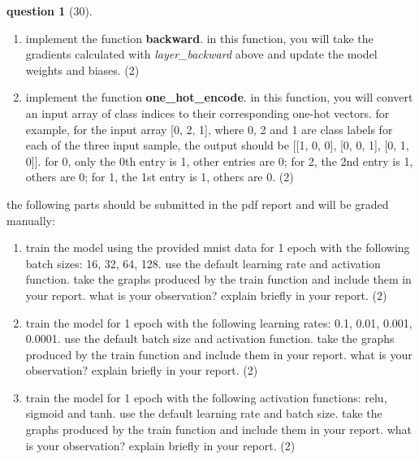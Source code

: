 \documentclass[12pt]{article}
\theoremstyle{definition}
\newtheorem{exercise}{question}%
\begin{document}
\begin{exercise}[30]
{\begin{enumerate}[label=(\theexercise.\arabic*)]
\begin{enumerate}
        \item implement the function \textbf{backward}. in this function, you will take the gradients calculated with \textit{layer\_backward} above and update the model weights and biases. (2)
        \item implement the function \textbf{one\_hot\_encode}. in this function, you will convert an input array of class indices to their corresponding one-hot vectors. for example, for the input array [0, 2, 1], where 0, 2 and 1 are class labels for each of the three input sample, the output should be [[1, 0, 0], [0, 0, 1], [0, 1, 0]]. for 0, only the 0th entry is 1, other entries are 0; for 2, the 2nd entry is 1, others are 0; for 1, the 1st entry is 1, others are 0. (2)
    \end{enumerate}
    the following parts should be submitted in the pdf report and will be graded manually:
    \begin{enumerate}[start=10]
    \item train the model using the provided mnist data for 1 epoch with the following batch sizes: 16, 32, 64, 128. use the default learning rate and activation function. take the graphs produced by the train function and include them in your report. what is your observation? explain briefly in your report. (2)
    \item train the model for 1 epoch with the following learning rates: 0.1, 0.01, 0.001, 0.0001. use the default batch size and activation function. take the graphs produced by the train function and include them in your report. what is your observation? explain briefly in your report. (2)
    \item train the model for 1 epoch with the following activation functions: relu, sigmoid and tanh. use the default learning rate and batch size. take the graphs produced by the train function and include them in your report. what is your observation? explain briefly in your report. (2)
    \end{enumerate}
\end{enumerate}}

\end{exercise}
\end{document}
